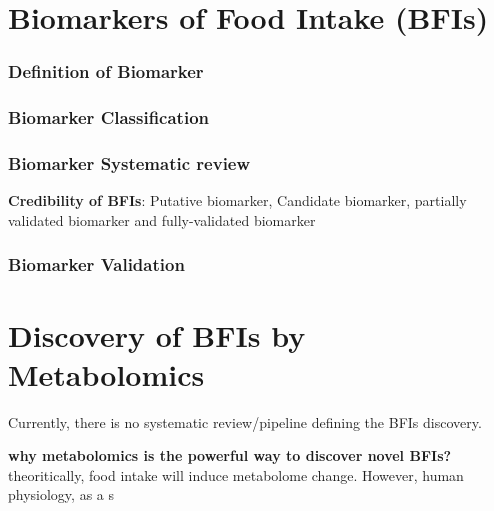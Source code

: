 \section{Biomarkers of Food Intake (BFIs)}
\subsubsection{Definition of Biomarker}

\subsubsection{Biomarker Classification}


\subsubsection{Biomarker Systematic review}
\textbf{Credibility of BFIs}: Putative biomarker, Candidate biomarker, partially validated biomarker and fully-validated biomarker

\subsubsection{Biomarker Validation}


\section{Discovery of BFIs by Metabolomics}
Currently, there is no systematic review/pipeline defining the BFIs discovery.

\textbf{why metabolomics is the powerful way to discover novel BFIs?}
theoritically, food intake will induce metabolome change. However, human physiology, as a s